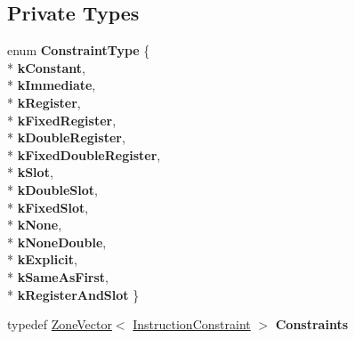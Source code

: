 \subsection*{Private Types}
\begin{DoxyCompactItemize}
\item 
enum {\bfseries Constraint\+Type} \{ \\*
{\bfseries k\+Constant}, 
\\*
{\bfseries k\+Immediate}, 
\\*
{\bfseries k\+Register}, 
\\*
{\bfseries k\+Fixed\+Register}, 
\\*
{\bfseries k\+Double\+Register}, 
\\*
{\bfseries k\+Fixed\+Double\+Register}, 
\\*
{\bfseries k\+Slot}, 
\\*
{\bfseries k\+Double\+Slot}, 
\\*
{\bfseries k\+Fixed\+Slot}, 
\\*
{\bfseries k\+None}, 
\\*
{\bfseries k\+None\+Double}, 
\\*
{\bfseries k\+Explicit}, 
\\*
{\bfseries k\+Same\+As\+First}, 
\\*
{\bfseries k\+Register\+And\+Slot}
 \}\hypertarget{classv8_1_1internal_1_1compiler_1_1_register_allocator_verifier_a714c5a060774496ca54ea2f5ea242cf9}{}\label{classv8_1_1internal_1_1compiler_1_1_register_allocator_verifier_a714c5a060774496ca54ea2f5ea242cf9}

\item 
typedef \hyperlink{classv8_1_1internal_1_1_zone_vector}{Zone\+Vector}$<$ \hyperlink{structv8_1_1internal_1_1compiler_1_1_register_allocator_verifier_1_1_instruction_constraint}{Instruction\+Constraint} $>$ {\bfseries Constraints}\hypertarget{classv8_1_1internal_1_1compiler_1_1_register_allocator_verifier_a3ea6e74f3b2a72913ea923a80c2469ce}{}\label{classv8_1_1internal_1_1compiler_1_1_register_allocator_verifier_a3ea6e74f3b2a72913ea923a80c2469ce}

\end{DoxyCompactItemize}
